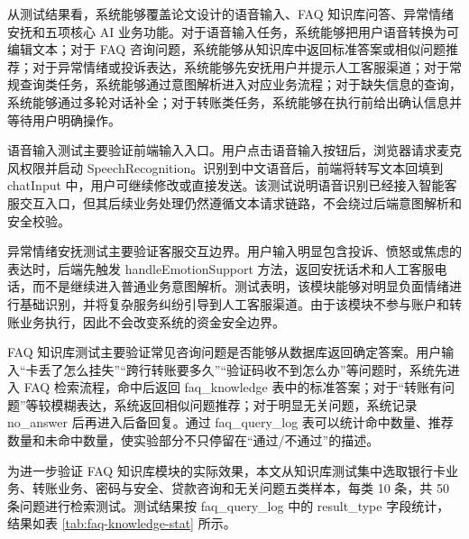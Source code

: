 \documentclass[bachelor, print]{xduthesis}
\begin{document}
从测试结果看，系统能够覆盖论文设计的语音输入、FAQ 知识库问答、异常情绪安抚和五项核心 AI 业务功能。对于语音输入任务，系统能够把用户语音转换为可编辑文本；对于 FAQ 咨询问题，系统能够从知识库中返回标准答案或相似问题推荐；对于异常情绪或投诉表达，系统能够先安抚用户并提示人工客服渠道；对于常规查询类任务，系统能够通过意图解析进入对应业务流程；对于缺失信息的查询，系统能够通过多轮对话补全；对于转账类任务，系统能够在执行前给出确认信息并等待用户明确操作。

语音输入测试主要验证前端输入入口。用户点击语音输入按钮后，浏览器请求麦克风权限并启动 SpeechRecognition。识别到中文语音后，前端将转写文本回填到 chatInput 中，用户可继续修改或直接发送。该测试说明语音识别已经接入智能客服交互入口，但其后续业务处理仍然遵循文本请求链路，不会绕过后端意图解析和安全校验。

异常情绪安抚测试主要验证客服交互边界。用户输入明显包含投诉、愤怒或焦虑的表达时，后端先触发 handleEmotionSupport 方法，返回安抚话术和人工客服电话，而不是继续进入普通业务意图解析。测试表明，该模块能够对明显负面情绪进行基础识别，并将复杂服务纠纷引导到人工客服渠道。由于该模块不参与账户和转账业务执行，因此不会改变系统的资金安全边界。

FAQ 知识库测试主要验证常见咨询问题是否能够从数据库返回确定答案。用户输入“卡丢了怎么挂失”“跨行转账要多久”“验证码收不到怎么办”等问题时，系统先进入 FAQ 检索流程，命中后返回 faq\_knowledge 表中的标准答案；对于“转账有问题”等较模糊表达，系统返回相似问题推荐；对于明显无关问题，系统记录 no\_answer 后再进入后备回复。通过 faq\_query\_log 表可以统计命中数量、推荐数量和未命中数量，使实验部分不只停留在“通过/不通过”的描述。

为进一步验证 FAQ 知识库模块的实际效果，本文从知识库测试集中选取银行卡业务、转账业务、密码与安全、贷款咨询和无关问题五类样本，每类 10 条，共 50 条问题进行检索测试。测试结果按 faq\_query\_log 中的 result\_type 字段统计，结果如表 \ref{tab:faq-knowledge-stat} 所示。
\end{document}
